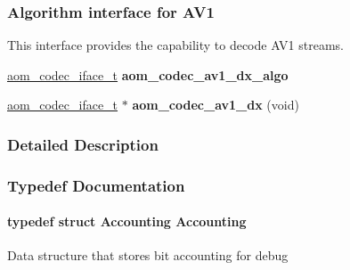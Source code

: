 \subsubsection*{Algorithm interface for A\+V1}
\label{_amgrp8c574bd9a585a04008b0d15257056884}%
This interface provides the capability to decode A\+V1 streams. \begin{DoxyCompactItemize}
\item 
\hyperlink{group__codec_ga4ef55b44c762836d1550e11921bed403}{aom\+\_\+codec\+\_\+iface\+\_\+t} {\bfseries aom\+\_\+codec\+\_\+av1\+\_\+dx\+\_\+algo}\hypertarget{group__aom__decoder_ga3747f3c9af0ff0dfc68196b00efd7771}{}\label{group__aom__decoder_ga3747f3c9af0ff0dfc68196b00efd7771}

\item 
\hyperlink{group__codec_ga4ef55b44c762836d1550e11921bed403}{aom\+\_\+codec\+\_\+iface\+\_\+t} $\ast$ {\bfseries aom\+\_\+codec\+\_\+av1\+\_\+dx} (void)\hypertarget{group__aom__decoder_gac1531da8eff42fd25462c95a450f0c4f}{}\label{group__aom__decoder_gac1531da8eff42fd25462c95a450f0c4f}

\end{DoxyCompactItemize}


\subsubsection{Detailed Description}


\subsubsection{Typedef Documentation}
\paragraph[{\texorpdfstring{Accounting}{Accounting}}]{\setlength{\rightskip}{0pt plus 5cm}typedef struct {\bf Accounting} {\bf Accounting}}\hypertarget{group__aom__decoder_ga4e755ba2db79154311994183ad9e4b28}{}\label{group__aom__decoder_ga4e755ba2db79154311994183ad9e4b28}
Data structure that stores bit accounting for debug 
